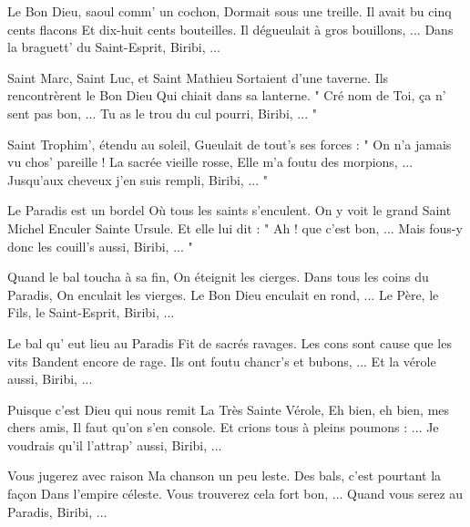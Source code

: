 \beginverse
Le Bon Dieu, saoul comm' un cochon,
Dormait sous une treille.
Il avait bu cinq cents flacons
Et dix-huit cents bouteilles.
Il dégueulait à gros bouillons, ...
Dans la braguett' du Saint-Esprit, Biribi, ...
\endverse

\beginverse
Saint Marc, Saint Luc, et Saint Mathieu
Sortaient d'une taverne.
Ils rencontrèrent le Bon Dieu
Qui chiait dans sa lanterne.
" Cré nom de Toi, ça n' sent pas bon, ...
Tu as le trou du cul pourri, Biribi, ... "
\endverse

\beginverse
Saint Trophim', étendu au soleil,
Gueulait de tout's ses forces :
" On n'a jamais vu chos' pareille !
La sacrée vieille rosse,
Elle m'a foutu des morpions, ...
Jusqu'aux cheveux j'en suis rempli, Biribi, ... "
\endverse

\beginverse
Le Paradis est un bordel
Où tous les saints s'enculent.
On y voit le grand Saint Michel
Enculer Sainte Ursule.
Et elle lui dit : " Ah ! que c'est bon, ...
Mais fous-y donc les couill's aussi, Biribi, ... "
\endverse

\beginverse
Quand le bal toucha à sa fin,
On éteignit les cierges.
Dans tous les coins du Paradis,
On enculait les vierges.
Le Bon Dieu enculait en rond, ...
Le Père, le Fils, le Saint-Esprit, Biribi, ...
\endverse

\beginverse
Le bal qu' eut lieu au Paradis
Fit de sacrés ravages.
Les cons sont cause que les vits
Bandent encore de rage.
Ils ont foutu chancr's et bubons, ...
Et la vérole aussi, Biribi, ...
\endverse

\beginverse
Puisque c'est Dieu qui nous remit
La Très Sainte Vérole,
Eh bien, eh bien, mes chers amis,
Il faut qu'on s'en console.
Et crions tous à pleins poumons : ...
Je voudrais qu'il l'attrap' aussi, Biribi, ...
\endverse

\beginverse
Vous jugerez avec raison
Ma chanson un peu leste.
Des bals, c'est pourtant la façon
Dans l'empire céleste.
Vous trouverez cela fort bon, ...
Quand vous serez au Paradis, Biribi, ...
\endverse

\endsong